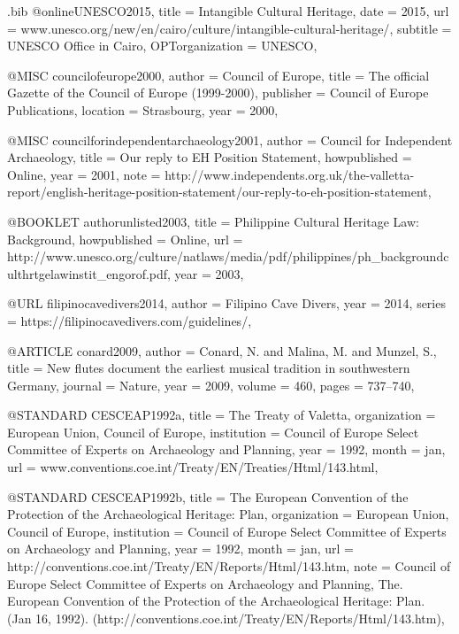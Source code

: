 \begin{filecontents}{\IJSRAidentifier.bib}
@online{UNESCO2015,
	title = {Intangible Cultural Heritage},
	date = {2015},
	url = {www.unesco.org/new/en/cairo/culture/intangible-cultural-heritage/},
	subtitle = {UNESCO Office in Cairo},
	OPTorganization = {UNESCO},
}

@MISC {councilofeurope2000,
author = {Council of Europe},
title  = {The official Gazette of the Council of Europe (1999-2000)},
publisher = {Council of Europe Publications},
location = {Strasbourg},
year   = {2000},
}

@MISC {councilforindependentarchaeology2001,
author       = {Council for Independent Archaeology},
title        = {Our reply to EH Position Statement},
howpublished = {Online},
year         = {2001},
note         = {http://www.independents.org.uk/the-valletta-report/english-heritage-position-statement/our-reply-to-eh-position-statement},
}

@BOOKLET {authorunlisted2003,
title        = {Philippine Cultural Heritage Law: Background},
howpublished = {Online},
url  = {http://www.unesco.org/culture/natlaws/media/pdf/philippines/ph_backgroundculthrtgelawinstit_engorof.pdf},
year         = {2003},
}

@URL {filipinocavedivers2014,
author = {Filipino Cave Divers},
year   = {2014},
series = {https://filipinocavedivers.com/guidelines/},
}

@ARTICLE {conard2009,
author  = {Conard, N. and Malina, M. and Munzel, S.},
title   = {New flutes document the earliest musical tradition in southwestern Germany},
journal = {Nature},
year    = {2009},
volume  = {460},
pages   = {737--740},
}

@STANDARD {CESCEAP1992a,
title        = {The Treaty of Valetta},
organization = {European Union, Council of Europe},
institution  = {Council of Europe Select Committee of Experts on Archaeology and Planning},
year         = {1992},
month        = {jan},
url          = {www.conventions.coe.int/Treaty/EN/Treaties/Html/143.html},
}

@STANDARD {CESCEAP1992b,
title        = {The European Convention of the Protection of the Archaeological Heritage: Plan},
organization = {European Union, Council of Europe},
institution  = {Council of Europe Select Committee of Experts on Archaeology and Planning},
year         = {1992},
month        = {jan},
url          = {http://conventions.coe.int/Treaty/EN/Reports/Html/143.htm},
note         = {Council of Europe Select Committee of Experts on Archaeology and Planning, The. European Convention of the Protection of the Archaeological Heritage: Plan. (Jan 16, 1992). (http://conventions.coe.int/Treaty/EN/Reports/Html/143.htm)},
}


\end{filecontents}
